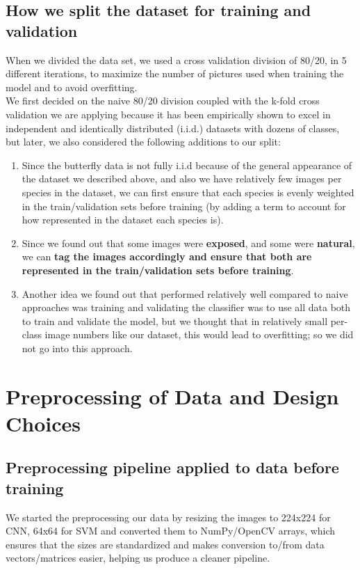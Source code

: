 \documentclass[10pt]{article} %
\begin{document}
\subsection{How we split the dataset for training and validation}
When we divided the data set, we used a cross validation division of 80/20, in 5 different iterations, to maximize the number of pictures used when training the model and to avoid overfitting.\\We first decided on the naive 80/20 division coupled with the k-fold cross validation we are applying because it has been empirically shown to excel in independent and identically distributed (i.i.d.) datasets with dozens of classes, but later, we also considered the following additions to our split:\begin{enumerate}
    \item Since the butterfly data is not fully i.i.d because of the general appearance of the dataset we described above, and also we have relatively few images per species in the dataset, we can first ensure that each species is evenly weighted in the train/validation sets before training (by adding a term to account for how represented in the dataset each species is).
    \item Since we found out that some images were \textbf{exposed}, and some were \textbf{natural}, we can \textbf{tag the images accordingly and ensure that both are represented in the train/validation sets before training}.
    \item Another idea we found out that performed relatively well compared to naive approaches was training and validating the classifier was to use all data both to train and validate the model, but we thought that in relatively small per-class image numbers like our dataset, this would lead to overfitting; so we did not go into this approach.
\end{enumerate}

\section{Preprocessing of Data and Design Choices}
\subsection{Preprocessing pipeline applied to data before training}
We started the preprocessing our data by resizing the images to 224x224 for CNN, 64x64 for SVM and converted them to NumPy/OpenCV arrays, which ensures that the sizes are standardized and makes conversion to/from data vectors/matrices easier, helping us produce a cleaner pipeline.
\end{document}
